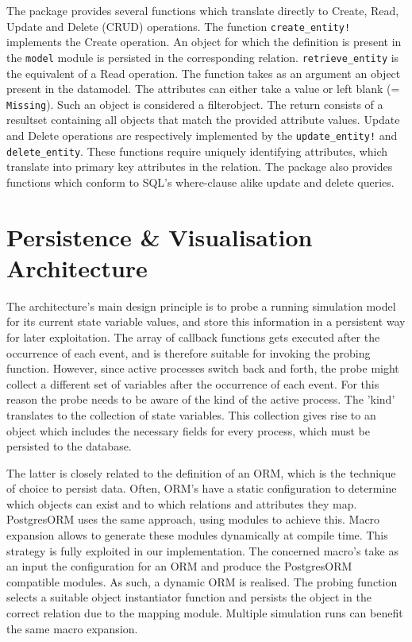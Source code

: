 \documentclass{juliacon}
\begin{document}
The package provides several functions which translate directly to Create, Read, Update and Delete (CRUD) \cite{todo} operations. The function \texttt{create\_entity!} implements the Create operation. An object for which the definition is present in the \texttt{model} module is persisted in the corresponding relation. \texttt{retrieve\_entity} is the equivalent of a Read operation. The function takes as an argument an object present in the datamodel. The attributes can either take a value or left blank (= \texttt{Missing}). Such an object is considered a filterobject. The return consists of a resultset containing all objects that match the provided attribute values. Update and Delete operations are respectively implemented by the \texttt{update\_entity!} and \texttt{delete\_entity}. These functions require uniquely identifying attributes, which translate into primary key attributes in the relation. The package also provides functions which conform to SQL's where-clause alike update and delete queries. \vskip 6pt

\section{Persistence \& Visualisation Architecture}\label{PArch}
The architecture's main design principle is to probe a running simulation model for its current state variable values, and store this information in a persistent way for later exploitation. The array of callback functions gets executed after the occurrence of each event, and is therefore suitable for invoking the probing function. However, since active processes switch back and forth, the probe might collect a different set of variables after the occurrence of each event. For this reason the probe needs to be aware of the kind of the active process. The 'kind' translates to the collection of state variables. This collection gives rise to an object which includes the necessary fields for every process, which must be persisted to the database. \vskip 6pt

The latter is closely related to the definition of an ORM, which is the technique of choice to persist data. Often, ORM's have a static configuration to determine which objects can exist and to which relations and attributes they map. PostgresORM \cite{tecnivelPostgresORM} uses the same approach, using modules to achieve this. Macro expansion allows to generate these modules dynamically at compile time. This strategy is fully exploited in our implementation. The concerned macro's take as an input the configuration for an ORM and produce the PostgresORM compatible modules. As such, a dynamic ORM is realised. The probing function selects a suitable object instantiator function and persists the object in the correct relation due to the mapping module. Multiple simulation runs can benefit the same macro expansion.\vskip 6pt
\end{document}
